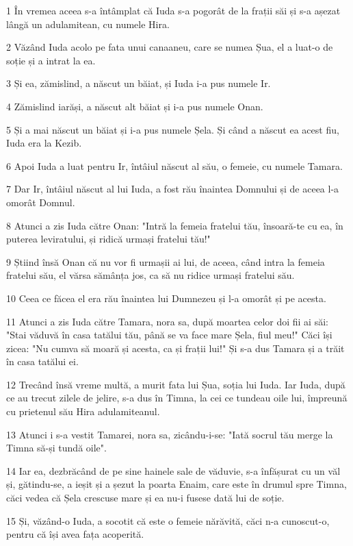 \par 1 În vremea aceea s-a întâmplat că Iuda s-a pogorât de la frații săi și s-a așezat lângă un adulamitean, cu numele Hira.
\par 2 Văzând Iuda acolo pe fata unui canaaneu, care se numea Șua, el a luat-o de soție și a intrat la ea.
\par 3 Și ea, zămislind, a născut un băiat, și Iuda i-a pus numele Ir.
\par 4 Zămislind iarăși, a născut alt băiat și i-a pus numele Onan.
\par 5 Și a mai născut un băiat și i-a pus numele Șela. Și când a născut ea acest fiu, Iuda era la Kezib.
\par 6 Apoi Iuda a luat pentru Ir, întâiul născut al său, o femeie, cu numele Tamara.
\par 7 Dar Ir, întâiul născut al lui Iuda, a fost rău înaintea Domnului și de aceea l-a omorât Domnul.
\par 8 Atunci a zis Iuda către Onan: "Intră la femeia fratelui tău, însoară-te cu ea, în puterea leviratului, și ridică urmași fratelui tău!"
\par 9 Știind însă Onan că nu vor fi urmașii ai lui, de aceea, când intra la femeia fratelui său, el vărsa sămânța jos, ca să nu ridice urmași fratelui său.
\par 10 Ceea ce făcea el era rău înaintea lui Dumnezeu și l-a omorât și pe acesta.
\par 11 Atunci a zis Iuda către Tamara, nora sa, după moartea celor doi fii ai săi: "Stai văduvă în casa tatălui tău, până se va face mare Șela, fiul meu!" Căci își zicea: "Nu cumva să moară și acesta, ca și frații lui!" Și s-a dus Tamara și a trăit în casa tatălui ei.
\par 12 Trecând însă vreme multă, a murit fata lui Șua, soția lui Iuda. Iar Iuda, după ce au trecut zilele de jelire, s-a dus în Timna, la cei ce tundeau oile lui, împreună cu prietenul său Hira adulamiteanul.
\par 13 Atunci i s-a vestit Tamarei, nora sa, zicându-i-se: "Iată socrul tău merge la Timna să-și tundă oile".
\par 14 Iar ea, dezbrăcând de pe sine hainele sale de văduvie, s-a înfășurat cu un văl și, gătindu-se, a ieșit și a șezut la poarta Enaim, care este în drumul spre Timna, căci vedea că Șela crescuse mare și ea nu-i fusese dată lui de soție.
\par 15 Și, văzând-o Iuda, a socotit că este o femeie nărăvită, căci n-a cunoscut-o, pentru că își avea fața acoperită.
